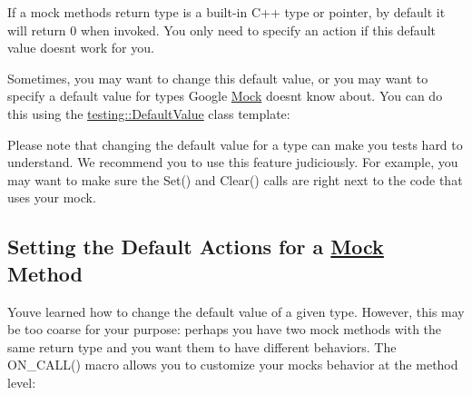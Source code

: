 If a mock method\textquotesingle{}s return type is a built-\/in C++ type or pointer, by default it will return 0 when invoked. You only need to specify an action if this default value doesn\textquotesingle{}t work for you.

Sometimes, you may want to change this default value, or you may want to specify a default value for types Google \mbox{\hyperlink{class_mock}{Mock}} doesn\textquotesingle{}t know about. You can do this using the {\ttfamily \mbox{\hyperlink{classtesting_1_1_default_value}{testing\+::\+Default\+Value}}} class template\+:


\begin{DoxyCode}{0}
\DoxyCodeLine{\};}
\DoxyCodeLine{}
\DoxyCodeLine{}
\DoxyCodeLine{}
\DoxyCodeLine{}
\DoxyCodeLine{}
\end{DoxyCode}


Please note that changing the default value for a type can make you tests hard to understand. We recommend you to use this feature judiciously. For example, you may want to make sure the {\ttfamily Set()} and {\ttfamily Clear()} calls are right next to the code that uses your mock.

\subsection*{Setting the Default Actions for a \mbox{\hyperlink{class_mock}{Mock}} Method}

You\textquotesingle{}ve learned how to change the default value of a given type. However, this may be too coarse for your purpose\+: perhaps you have two mock methods with the same return type and you want them to have different behaviors. The {\ttfamily O\+N\+\_\+\+C\+A\+L\+L()} macro allows you to customize your mock\textquotesingle{}s behavior at the method level\+:


